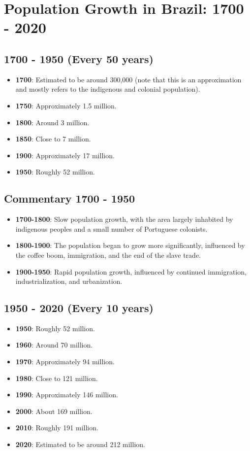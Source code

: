 \section{Population Growth in Brazil: 1700 - 2020}

\subsection*{1700 - 1950 (Every 50 years)}
\begin{itemize}
    \item \textbf{1700}: Estimated to be around 300,000 (note that this is an approximation and mostly refers to the indigenous and colonial population).
    \item \textbf{1750}: Approximately 1.5 million.
    \item \textbf{1800}: Around 3 million.
    \item \textbf{1850}: Close to 7 million.
    \item \textbf{1900}: Approximately 17 million.
    \item \textbf{1950}: Roughly 52 million.
\end{itemize}

\subsection*{Commentary 1700 - 1950}
\begin{itemize}
    \item \textbf{1700-1800}: Slow population growth, with the area largely inhabited by indigenous peoples and a small number of Portuguese colonists.
    \item \textbf{1800-1900}: The population began to grow more significantly, influenced by the coffee boom, immigration, and the end of the slave trade.
    \item \textbf{1900-1950}: Rapid population growth, influenced by continued immigration, industrialization, and urbanization.
\end{itemize}

\subsection*{1950 - 2020 (Every 10 years)}
\begin{itemize}
    \item \textbf{1950}: Roughly 52 million.
    \item \textbf{1960}: Around 70 million.
    \item \textbf{1970}: Approximately 94 million.
    \item \textbf{1980}: Close to 121 million.
    \item \textbf{1990}: Approximately 146 million.
    \item \textbf{2000}: About 169 million.
    \item \textbf{2010}: Roughly 191 million.
    \item \textbf{2020}: Estimated to be around 212 million.
\end{itemize}

